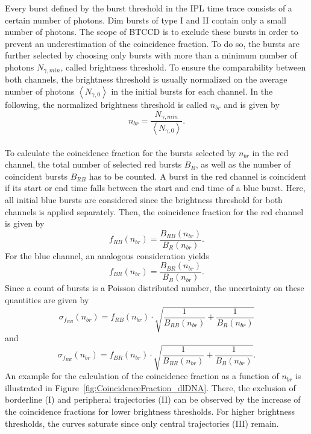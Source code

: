 Every burst defined by the burst threshold in the \gls{IPL} time trace consists of a certain number of photons. Dim bursts of type I and II contain only a small number of photons. The scope of \gls{BTCCD} is to exclude these bursts in order to prevent an underestimation of the coincidence fraction. To do so, the bursts are further selected by choosing only bursts with more than a minimum number of photons $N_{\gamma,min}$, called brightness threshold. To ensure the comparability between both channels, the brightness threshold is usually normalized on the average number of photons $\left\langle N_{\gamma,0} \right\rangle$ in the initial bursts for each channel. In the following, the normalized brightness threshold is called $n_{br}$ and is given by
\begin{equation}
	n_{br} = \frac{N_{\gamma,min}}{\left\langle N_{\gamma,0} \right\rangle}.
\end{equation}\\

To calculate the coincidence fraction for the bursts selected by $n_{br}$ in the red channel, the total number of selected red bursts $B_{R}$, as well as the number of coincident bursts $B_{RB}$ has to be counted. A burst in the red channel is coincident if its start or end time falls between the start and end time of a blue burst. Here, all initial blue bursts are considered since the brightness threshold for both channels is applied separately. Then, the coincidence fraction for the red channel is given by
\begin{equation}
	f_{RB}(n_{br}) = \frac{B_{RB}(n_{br})}{B_{R}(n_{br})}.
\end{equation}
For the blue channel, an analogous consideration yields
\begin{equation}
f_{BR}(n_{br}) = \frac{B_{BR}(n_{br})}{B_{B}(n_{br})}.
\end{equation}
Since a count of bursts is a Poisson distributed number, the uncertainty on these quantities are given by
\begin{equation} \label{Equation:UncertaintyCoincidenceFractionRed}
	\sigma_{f_{RB}}(n_{br}) = f_{RB}(n_{br}) \cdot \sqrt{\frac{1}{B_{RB}(n_{br})} + \frac{1}{B_{R}(n_{br})}}
\end{equation}
and
\begin{equation}
	\sigma_{f_{BR}}(n_{br}) = f_{BR}(n_{br}) \cdot \sqrt{\frac{1}{B_{BR}(n_{br})} + \frac{1}{B_{B}(n_{br})}}.
\end{equation}
An example for the calculation of the coincidence fraction as a function of $n_{br}$ is illustrated in Figure~\ref{fig:CoincidenceFraction_dlDNA}. There, the exclusion of borderline (I) and peripheral trajectories (II) can be observed by the increase of the coincidence fractions for lower brightness thresholds. For higher brightness thresholds, the curves saturate since only central trajectories (III) remain.

